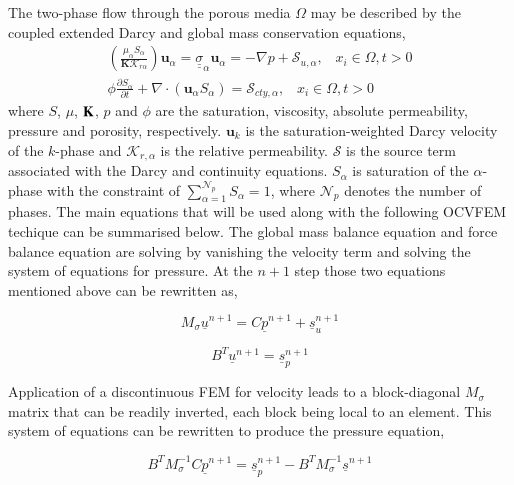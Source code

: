 \documentclass[preprint,authoryear,12pt]{elsarticle}
\begin{document}
\noindent The two-phase flow through the porous media $\Omega$ may be described by the coupled extended Darcy and global mass conservation equations,
\begin{eqnarray}
\left(\displaystyle\frac{\mu_{\alpha}S_{\alpha}}{{\mathbf K}\mathcal{K}_{r\alpha}}\right) {\mathbf u}_{\alpha} = \underline{\underline{\sigma}}_{\alpha} {\mathbf u}_{\alpha} = -\nabla p + \mathcal{S}_{u,\alpha},\;\;\; x_{i}\in\Omega, t>0 \label{eqn:darcy_eqn} \\
\phi\displaystyle\frac{\partial S_{\alpha} }{\partial t} +   \nabla \cdot \left( {\mathbf u}_{\alpha}  S_{\alpha}\right) =  \mathcal{S}_{cty,\alpha},\;\;\; x_{i}\in\Omega, t>0\label{eqn:saturation_eqn}
\end{eqnarray}
where $S$, $\mu$, ${\bf K}$, $p$ and $\phi$ are the saturation, viscosity, absolute permeability, pressure and porosity, respectively. ${\mathbf u}_{k}$ is the saturation-weighted Darcy velocity of the $k$-phase and $\mathcal{K}_{r,\alpha}$ is the relative permeability. $\mathcal{S}$ is the source term associated with the Darcy and continuity equations. $S_{\alpha}$ is saturation of the $\alpha$-phase with the constraint of $\sum\limits_{\alpha=1}^{\mathcal{N}_{p}} S_{\alpha} = 1$, where $\mathcal{N}_{p}$ denotes the number of phases.
The main equations that will be used along with the following OCVFEM techique can be summarised below. The global mass balance equation and force balance equation are solving by vanishing the velocity term and solving the system of equations for pressure. At the $n+1$ step those two equations mentioned above can be rewritten as,

\begin{equation}
M_{\sigma} {{\underline{u}}^{n+1}} = C {\underline{p}^{n+1}} + {\underline{s}_u ^{n+1}}
\label{e:mass_bal}
\end{equation}

\begin{equation}
B^T {{\underline{u}}^{n+1}} = {\underline{s}_p ^{n+1}}
\label{e:force_bal}
\end{equation}

\noindent Application of a discontinuous FEM for velocity leads to a block-diagonal $M_{\sigma}$ matrix that can be readily inverted, each block being local to an element. This system of equations can be rewritten to produce the pressure equation, 

\begin{equation}
B^T M_{\sigma} ^{-1} C{{\underline{p}}^{n+1}} = {\underline{s}_p ^{n+1}} - B^T M_{\sigma} ^{-1} {{\underline{s}}^{n+1}} 
\label{e:pressure_eq}
\end{equation}
\end{document}
